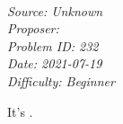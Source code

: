 \SSbreak\\
\emph{Source: Unknown}\\
\emph{Proposer: \Pnjoy}\\ %
\emph{Problem ID: 232}\\
\emph{Date: 2021-07-19}\\
\emph{Difficulty: Beginner}\\
\SSbreak

\bigskip

\begin{solution}\hfil\medskip
  
    It's . 
\end{solution}\bigskip
